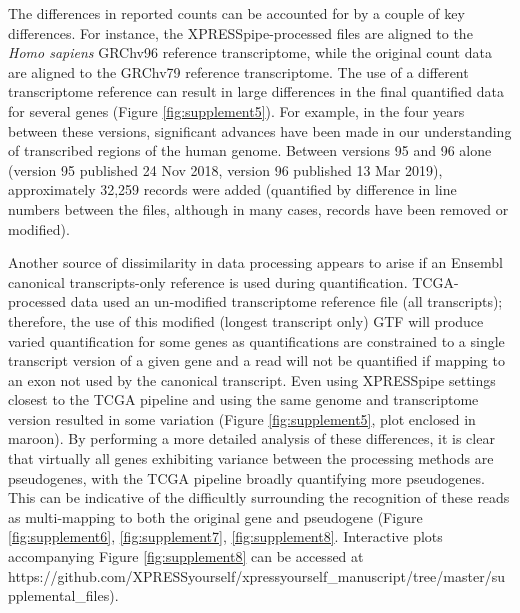 \documentclass[10pt, oneside]{article}
\begin{document}
The differences in reported counts can be accounted for by a couple of key differences. For instance, the XPRESSpipe-processed files are aligned to the \textit{Homo sapiens} GRChv96 reference transcriptome, while the original count data are aligned to the GRChv79 reference transcriptome. The use of a different transcriptome reference can result in large differences in the final quantified data for several genes (Figure \ref{fig:supplement5}). For example, in the four years between these versions, significant advances have been made in our understanding of transcribed regions of the human genome. Between versions 95 and 96 alone (version 95 published 24 Nov 2018, version 96 published 13 Mar 2019), approximately 32,259 records were added (quantified by difference in line numbers between the files, although in many cases, records have been removed or modified). \par

Another source of dissimilarity in data processing appears to arise if an Ensembl canonical transcripts-only reference is used during quantification. TCGA-processed data used an un-modified transcriptome reference file (all transcripts); therefore, the use of this modified (longest transcript only) GTF will produce varied quantification for some genes as quantifications are constrained to a single transcript version of a given gene and a read will not be quantified if mapping to an exon not used by the canonical transcript. Even using XPRESSpipe settings closest to the TCGA pipeline and using the same genome and transcriptome version resulted in some variation (Figure \ref{fig:supplement5}, plot enclosed in maroon). By performing a more detailed analysis of these differences, it is clear that virtually all genes exhibiting variance between the processing methods are pseudogenes, with the TCGA pipeline broadly quantifying more pseudogenes. This can be indicative of the difficultly surrounding the recognition of these reads as multi-mapping to both the original gene and pseudogene (Figure \ref{fig:supplement6}, \ref{fig:supplement7}, \ref{fig:supplement8}. Interactive plots accompanying Figure \ref{fig:supplement8} can be accessed at https://github.com/XPRESSyourself/xpressyourself\_manuscript/tree/master/supplemental\_files). \par
\end{document}
